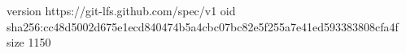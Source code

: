 version https://git-lfs.github.com/spec/v1
oid sha256:cc48d5002d675e1ecd840474b5a4cbc07bc82e5f255a7e41ed593383808cfa4f
size 1150
